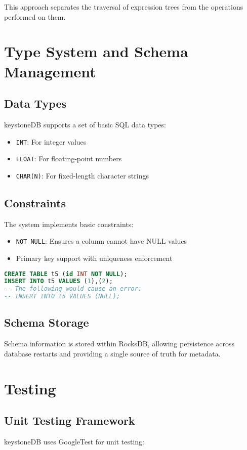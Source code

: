 \documentclass[12pt,a4paper]{article}
\begin{document}
This approach separates the traversal of expression trees from the operations performed on them.

\section{Type System and Schema Management}
\subsection{Data Types}
keystoneDB supports a set of basic SQL data types:

\begin{itemize}
    \item \texttt{INT}: For integer values
    \item \texttt{FLOAT}: For floating-point numbers
    \item \texttt{CHAR(N)}: For fixed-length character strings
\end{itemize}

\subsection{Constraints}
The system implements basic constraints:

\begin{itemize}
    \item \texttt{NOT NULL}: Ensures a column cannot have NULL values
    \item Primary key support with uniqueness enforcement
\end{itemize}

\begin{lstlisting}[language=SQL,caption=Example of constraint usage]
CREATE TABLE t5 (id INT NOT NULL);
INSERT INTO t5 VALUES (1),(2);
-- The following would cause an error:
-- INSERT INTO t5 VALUES (NULL);
\end{lstlisting}

\subsection{Schema Storage}
Schema information is stored within RocksDB, allowing persistence across database restarts and providing a single source of truth for metadata.

\section{Testing}
\subsection{Unit Testing Framework}
keystoneDB uses GoogleTest for unit testing:
\end{document}
